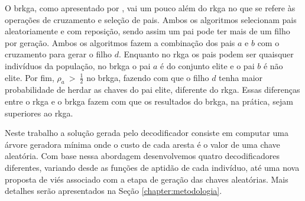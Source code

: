 O \gls{brkga},  como apresentado por \cite{resende2010},  vai um pouco
além  do \gls{rkga}  no que  se refere  às operações  de cruzamento  e
seleção de pais.  Ambos os algoritmos selecionam pais aleatoriamente e
com  reposição, sendo  assim um  pai  pode ter  mais de  um filho  por
geração.  Ambos  os algoritmos fazem a  combinação dos pais $a$  e $b$
com o  cruzamento para gerar o  filho $d$.  Enquanto no  \gls{rkga} os
pais podem ser quaisquer indivíduos da população, no \gls{brkga} o pai
$a$ é do conjunto elite e o pai $b$ é não elite.  Por fim, $\rho_a \ >
\ \frac{1}{2}$ no \gls{brkga}, fazendo com que o filho $d$ tenha maior
probabilidade  de  herdar  as  chaves   do  pai  elite,  diferente  do
\gls{rkga}.  Essas diferenças entre o \gls{rkga} e o \gls{brkga} fazem
com que os resultados do  \gls{brkga}, na prática, sejam superiores ao
\gls{rkga}.

Neste  trabalho  a  solução  gerada  pelo  decodificador  consiste  em
computar uma  árvore geradora mínima onde  o custo de cada  aresta é o
valor de uma  chave aleatória. Com base  nessa abordagem desenvolvemos
quatro  decodificadores  diferentes,  variando  desde  as  funções  de
aptidão de cada indivíduo, até uma nova proposta de viés associado com
a  etapa  de  geração  das chaves  aleatórias.   Mais  detalhes  serão
apresentados na Seção \ref{chapter:metodologia}.
